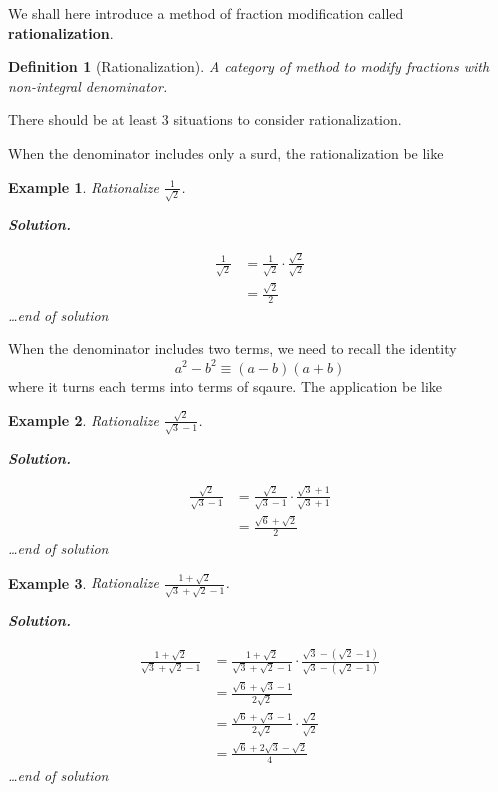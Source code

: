 \documentclass[12pt]{article}
\newtheorem{definition}{Definition}[section]
\newtheorem*{example}{Example}
\newenvironment{solution}{\textbf{Solution.} \par}{\hfill \textit{\dots end of solution}}
\begin{document}
    We shall here introduce a method of fraction modification called \textbf{rationalization}.

    \begin{definition}[Rationalization]
        A category of method to modify fractions with non-integral denominator.
    \end{definition}

    There should be at least 3 situations to consider rationalization.

    When the denominator includes only a surd, the rationalization be like

    \begin{example}
        Rationalize $\frac{1}{\sqrt{2}}$.

        \begin{solution}
            \begin{align*}
                \frac{1}{\sqrt{2}}&=\frac{1}{\sqrt{2}}\cdot \frac{\sqrt{2}}{\sqrt{2}}\\
                &=\frac{\sqrt{2}}{2}
            \end{align*}
        \end{solution}
    \end{example}

    When the denominator includes two terms, we need to recall the identity \[a^2-b^2\equiv (a-b)(a+b)\] where it turns each terms into terms of sqaure. The application be like

    \begin{example}
        Rationalize $\frac{\sqrt{2}}{\sqrt{3}-1}$.

        \begin{solution}
            \begin{align*}
                \frac{\sqrt{2}}{\sqrt{3}-1}&=\frac{\sqrt{2}}{\sqrt{3}-1}\cdot \frac{\sqrt{3}+1}{\sqrt{3}+1}\\
                &=\frac{\sqrt{6}+\sqrt{2}}{2}
            \end{align*}
        \end{solution}
    \end{example}

    \begin{example}
        Rationalize $\frac{1+\sqrt{2}}{\sqrt{3}+\sqrt{2}-1}$.

        \begin{solution}
            \begin{align*}
                \frac{1+\sqrt{2}}{\sqrt{3}+\sqrt{2}-1}&=\frac{1+\sqrt{2}}{\sqrt{3}+\sqrt{2}-1}\cdot \frac{\sqrt{3}-(\sqrt{2}-1)}{\sqrt{3}-(\sqrt{2}-1)}\\
                &=\frac{\sqrt{6}+\sqrt{3}-1}{2\sqrt{2}}\\
                &=\frac{\sqrt{6}+\sqrt{3}-1}{2\sqrt{2}}\cdot \frac{\sqrt{2}}{\sqrt{2}}\\
                &=\frac{\sqrt{6}+2\sqrt{3}-\sqrt{2}}{4}
            \end{align*}
        \end{solution}
    \end{example}
\end{document}

